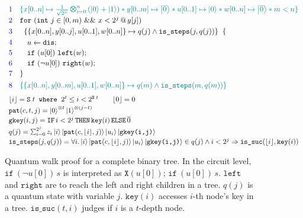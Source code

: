 \begin{figure}[t]
{\centering
{\small
\[
\begin{array}{r l}
\textcolor{blue}{1}
&
\textcolor{teal}{
\{ x[0..n] \mapsto \shadi{2^n}{n}{} *
   y[0..m] \mapsto \ket{\overline{0}} *
   u[0..1] \mapsto \ket{0} *
   w[0..n] \mapsto \ket{\overline{0}} * m < n\}
}
\\[0.3em]
\textcolor{blue}{2}
&
\texttt{for}~{(\texttt{int}~j \in [0,m)~\&\&~x < 2^j \,@\, y[j])}
\\[0.3em]

\textcolor{blue}{3}
&
\;\;
\{ \{x[0..n],y[0..j],u[0..1],w[0..n]\} \mapsto q(j) \wedge \texttt{is\_steps}(j,q(j)) \}
\;\;\{
\\[0.3em]

\textcolor{blue}{4}
&
\quad
\ssassign{u}{}{\sdis};
\\[0.2em]

\textcolor{blue}{5}
&
\quad
\sifq{u[0]}{\texttt{left}(w)};
\\[0.2em]

\textcolor{blue}{6}
&
\quad
\sifq{\neg u[0]}{\texttt{right}(w)};
\\[0.2em]
\textcolor{blue}{7}
&
\}
\\[0.4em]

\textcolor{blue}{8}
&
\textcolor{teal}{
\{ \{x[0..n],y[0..m],u[0..1],w[0..n]\} \mapsto q(m) \wedge \texttt{is\_steps}(m,q(m)) \}
}
\end{array}
\]
}
{\small
\[
\begin{array}{l}
\lfloor i \rfloor = \snext{t} \;\;\texttt{where}\;\;2^t \le i < 2^{\snext{t}}
\qquad \lfloor 0 \rfloor = 0
\\[0.2em]
\texttt{pat}(c,t,j) = \ket{0}^{\otimes t}\ket{1}^{\otimes (j-t)}
\\[0.2em]
\texttt{gkey}(i,j) = \texttt{IF}\, i < 2^j\,\texttt{THEN}\,\texttt{key}(i)\,\texttt{ELSE}\,\overline{0}
\\[0.2em]
q(j)=\schai{2^j}{z_i}{i}{\ket{\texttt{pat}(c,\lfloor i \rfloor,j)}\ket{u_i}\ket{\texttt{gkey(i,j)}}}
\\[0.2em]
\texttt{is\_steps}(j,q(j))=
\forall i. \ket{i}\ket{\texttt{pat}(c,\lfloor i \rfloor,j)}\ket{u_i}\ket{\texttt{gkey(i,j)}} \in q(j) \wedge i < 2^j
\Rightarrow \texttt{is\_suc}(\lfloor i \rfloor,\texttt{key}(i))
\end{array}
\]
}
}
\caption{Quantum walk proof for a complete binary tree. In the circuit level, $\texttt{if}~(\neg u[0]) \,s$ is interpreted as $\texttt{X}(u[0]);\,\texttt{if}~(u[0])\,s$. $\texttt{left}$ and $\texttt{right}$ are to reach the left and right children in a tree. $q(j)$ is a quantum state with variable $j$. $\texttt{key}(i)$ accesses $i$-th node's key in a tree.
$\texttt{is\_suc}(t,i)$ judges if $i$ is a $t$-depth node.}
\label{fig:background-circuit-example-walk}
\end{figure}


